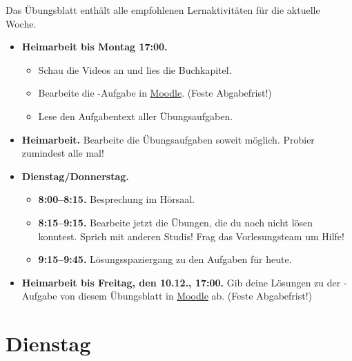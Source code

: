 \documentclass{uebung_cs}
\begin{document}
Das Übungsblatt enthält alle empfohlenen Lernaktivitäten für die aktuelle Woche.

\begin{itemize}
\item \textbf{Heimarbeit bis Montag 17:00.}
    \begin{itemize}
    \item 
    Schau die Videos an und lies die Buchkapitel.
    \item Bearbeite die -Aufgabe in \href{https://moodle.studiumdigitale.uni-frankfurt.de/moodle/course/view.php?id=2241}{Moodle}. (Feste Abgabefrist!)
    \item Lese den Aufgabentext aller Übungsaufgaben.
    \end{itemize}
\item \textbf{Heimarbeit.} Bearbeite die Übungsaufgaben soweit möglich. Probier zumindest alle mal!
\item \textbf{Dienstag/Donnerstag.}
\begin{itemize}
    \item \textbf{8:00--8:15.} Besprechung im Hörsaal.
    \item \textbf{8:15--9:15.} Bearbeite jetzt die Übungen, die du noch nicht lösen konntest. Sprich mit anderen Studis! Frag das Vorlesungsteam um Hilfe!
    \item \textbf{9:15--9:45.} Lösungsspaziergang zu den Aufgaben für heute.
\end{itemize}

\item \textbf{Heimarbeit bis Freitag, den 10.12., 17:00.} Gib deine Lösungen zu der -Aufgabe von diesem Übungsblatt in \href{https://moodle.studiumdigitale.uni-frankfurt.de/moodle/course/view.php?id=2241}{Moodle} ab. (Feste Abgabefrist!)
\end{itemize}

\section*{Dienstag}
\end{document}
